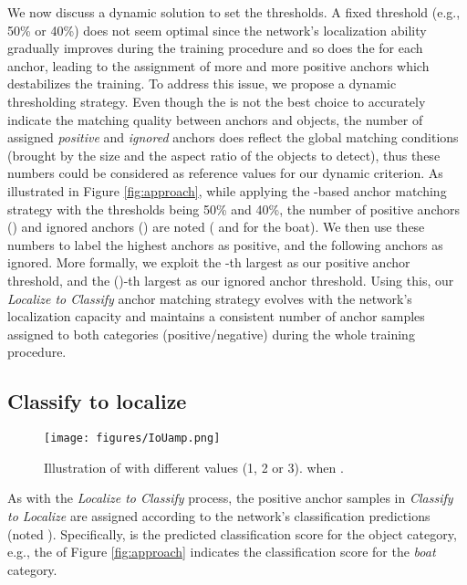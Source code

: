 \documentclass[runningheads]{llncs}
\begin{document}
We now discuss a dynamic solution to set the thresholds. A fixed threshold (e.g., 50\% or 40\%) does not seem optimal since the network's localization ability gradually improves during the training procedure and so does the  for each anchor, leading to the assignment of more and more positive anchors which destabilizes the training.
To address this issue, we propose a dynamic thresholding strategy. 
Even though the  is not the best choice to accurately indicate the matching quality between anchors and objects, the number of assigned \emph{positive} and \emph{ignored} anchors does reflect the global matching conditions (brought by the size and the aspect ratio of the objects to detect), thus these numbers could be considered as reference values for our dynamic criterion.
As illustrated in Figure \ref{fig:approach}, while applying the -based anchor matching strategy with the thresholds being 50\% and 40\%, the number of positive anchors () and ignored anchors () are noted ( and  for the boat). We then use these numbers to label the  highest  anchors as positive, and the following  anchors as ignored. 
More formally, we exploit the -th largest  as our positive anchor threshold, and the ()-th largest  as our ignored anchor threshold.
Using this, our \emph{Localize to Classify} anchor matching strategy evolves with the network's localization capacity and maintains a consistent number of anchor samples assigned to both categories (positive/negative) during the whole training procedure.

\subsection{Classify to localize}
\label{sec:approach_c2r}

\begin{figure}[t]
\begin{center}
\texttt{[image: figures/IoUamp.png]}
\end{center}
   \caption{Illustration of  with different  values (1, 2 or 3).  when .}
\label{fig:iouamp}
\end{figure}

As with the \emph{Localize to Classify} process, the positive anchor samples in \emph{Classify to Localize} are assigned according to the network's classification predictions (noted ). 
Specifically,  is the predicted classification score for the object category, e.g., the  of Figure \ref{fig:approach} indicates the classification score for the \emph{boat} category. 
\end{document}
